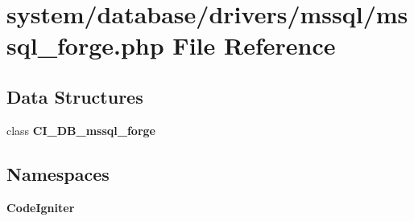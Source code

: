 \section{system/database/drivers/mssql/mssql\-\_\-forge.php File Reference}
\label{mssql__forge_8php}
\subsection*{Data Structures}
\begin{DoxyCompactItemize}
\item 
class {\bf C\-I\-\_\-\-D\-B\-\_\-mssql\-\_\-forge}
\end{DoxyCompactItemize}
\subsection*{Namespaces}
\begin{DoxyCompactItemize}
\item 
{\bf Code\-Igniter}
\end{DoxyCompactItemize}
